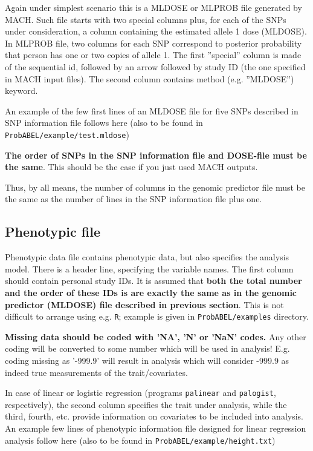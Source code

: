 \documentclass[12pt]{article}
\begin{document}
Again under simplest scenario this is a MLDOSE or MLPROB file generated by MACH.
Such file starts with two special columns plus, for each of the SNPs 
under consideration, a column containing the estimated allele 1 dose (MLDOSE).
In MLPROB file, two columns for each SNP correspond to posterior probability 
that person has one or two copies of allele 1. 
The first ''special'' column is made of the sequential id, 
followed by an arrow followed by study ID (the one specified in 
MACH input files). The second column contains method 
(e.g. ''MLDOSE'') keyword.

An example of the few first lines of an MLDOSE file for 
five SNPs described in SNP information file follows here (also 
to be found in \texttt{ProbABEL/example/test.mldose})



\textbf{The order of SNPs in the SNP information file and DOSE-file
must be the same}. This should be the case if you just used MACH outputs.

Thus, by all means, the number of columns in the genomic predictor file 
must be the same as the number of lines in the SNP information file plus one. 

\subsection{Phenotypic file}
\label{ssec:phenoin}

Phenotypic data file contains phenotypic data, but also specifies the 
analysis model. There is a header line, specifying the variable names. 
The first column should contain personal study IDs. It is assumed 
that \textbf{both the total number and the order of these IDs is are 
exactly the same as in the genomic predictor (MLDOSE) file described in 
previous section}. This is not difficult to arrange using e.g. \texttt{R}; 
example is given in \texttt{ProbABEL/examples} directory. 

\textbf{Missing data should be coded with 'NA', 'N' or 'NaN' codes.} Any 
other coding will be converted to some number which will be used in 
analysis! E.g. coding missing as '-999.9' will result in analysis which 
will consider -999.9 as indeed true measurements of the trait/covariates.  

In case of linear or logistic regression (programs \texttt{palinear} and 
\texttt{palogist}, respectively), the second column specifies the trait 
under analysis, while the third, fourth, etc. 
provide information on covariates to be included into analysis. 
An example few lines of phenotypic information file designed for 
linear regression analysis follow here (also 
to be found in \texttt{ProbABEL/example/height.txt})
\end{document}
